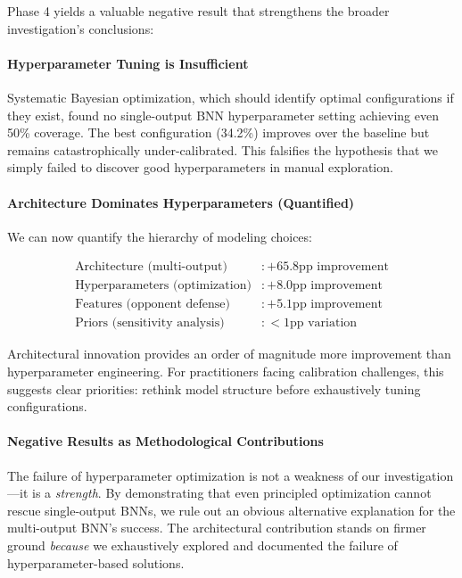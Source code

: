 Phase 4 yields a valuable negative result that strengthens the broader investigation's conclusions:

\paragraph{Hyperparameter Tuning is Insufficient}

Systematic Bayesian optimization, which should identify optimal configurations if they exist, found no single-output BNN hyperparameter setting achieving even 50\% coverage. The best configuration (34.2\%) improves over the baseline but remains catastrophically under-calibrated. This falsifies the hypothesis that we simply failed to discover good hyperparameters in manual exploration.

\paragraph{Architecture Dominates Hyperparameters (Quantified)}

We can now quantify the hierarchy of modeling choices:

\begin{align}
    \text{Architecture (multi-output)} &: +65.8\text{pp improvement} \\
    \text{Hyperparameters (optimization)} &: +8.0\text{pp improvement} \\
    \text{Features (opponent defense)} &: +5.1\text{pp improvement} \\
    \text{Priors (sensitivity analysis)} &: <1\text{pp variation}
\end{align}

Architectural innovation provides an order of magnitude more improvement than hyperparameter engineering. For practitioners facing calibration challenges, this suggests clear priorities: rethink model structure before exhaustively tuning configurations.

\paragraph{Negative Results as Methodological Contributions}

The failure of hyperparameter optimization is not a weakness of our investigation—it is a \textit{strength}. By demonstrating that even principled optimization cannot rescue single-output BNNs, we rule out an obvious alternative explanation for the multi-output BNN's success. The architectural contribution stands on firmer ground \textit{because} we exhaustively explored and documented the failure of hyperparameter-based solutions.

